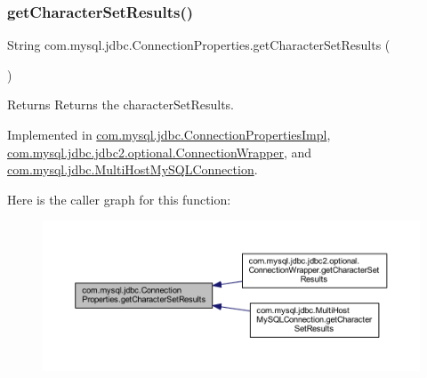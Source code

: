 \subsubsection{\texorpdfstring{get\+Character\+Set\+Results()}{getCharacterSetResults()}}
{\footnotesize\ttfamily String com.\+mysql.\+jdbc.\+Connection\+Properties.\+get\+Character\+Set\+Results (\begin{DoxyParamCaption}{ }\end{DoxyParamCaption})}

\begin{DoxyReturn}{Returns}
Returns the character\+Set\+Results. 
\end{DoxyReturn}


Implemented in \mbox{\hyperlink{classcom_1_1mysql_1_1jdbc_1_1_connection_properties_impl_a4f02882c0eca15cce4f9bf4dbd496701}{com.\+mysql.\+jdbc.\+Connection\+Properties\+Impl}}, \mbox{\hyperlink{classcom_1_1mysql_1_1jdbc_1_1jdbc2_1_1optional_1_1_connection_wrapper_a2ee7452dd873073dc9012388bfd92212}{com.\+mysql.\+jdbc.\+jdbc2.\+optional.\+Connection\+Wrapper}}, and \mbox{\hyperlink{classcom_1_1mysql_1_1jdbc_1_1_multi_host_my_s_q_l_connection_aaca38e46c6210e8784c710b30740e820}{com.\+mysql.\+jdbc.\+Multi\+Host\+My\+S\+Q\+L\+Connection}}.

Here is the caller graph for this function\+:\nopagebreak
\begin{figure}[H]
\begin{center}
\leavevmode
\includegraphics[width=350pt]{interfacecom_1_1mysql_1_1jdbc_1_1_connection_properties_a64a9d2f56ed041326aa829a7f665747a_icgraph}
\end{center}
\end{figure}
\mbox{\label{interfacecom_1_1mysql_1_1jdbc_1_1_connection_properties_a8097aba9e8a5a513b9dec2c4bfb04fd2}} 
